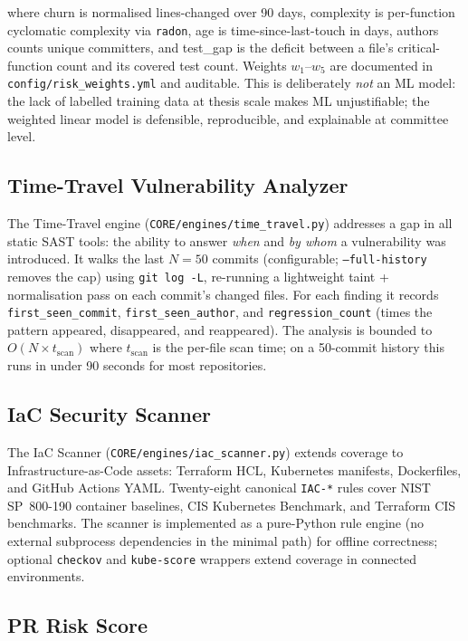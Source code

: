 where churn is normalised lines-changed over 90 days, complexity is per-function cyclomatic complexity via \texttt{radon}, age is time-since-last-touch in days, authors counts unique committers, and test\_gap is the deficit between a file's critical-function count and its covered test count. Weights $w_1$--$w_5$ are documented in \texttt{config/risk\_weights.yml} and auditable. This is deliberately \textit{not} an ML model: the lack of labelled training data at thesis scale makes ML unjustifiable; the weighted linear model is defensible, reproducible, and explainable at committee level.

\subsection{Time-Travel Vulnerability Analyzer}
\label{sec:time_travel_design}

The Time-Travel engine (\texttt{CORE/engines/time\_travel.py}) addresses a gap in all static SAST tools: the ability to answer \textit{when} and \textit{by whom} a vulnerability was introduced. It walks the last $N = 50$ commits (configurable; \texttt{--full-history} removes the cap) using \texttt{git log -L}, re-running a lightweight taint + normalisation pass on each commit's changed files. For each finding it records \texttt{first\_seen\_commit}, \texttt{first\_seen\_author}, and \texttt{regression\_count} (times the pattern appeared, disappeared, and reappeared). The analysis is bounded to $O(N \times t_{\text{scan}})$ where $t_{\text{scan}}$ is the per-file scan time; on a 50-commit history this runs in under 90 seconds for most repositories.

\subsection{IaC Security Scanner}
\label{sec:iac_design}

The IaC Scanner (\texttt{CORE/engines/iac\_scanner.py}) extends coverage to Infrastructure-as-Code assets: Terraform HCL, Kubernetes manifests, Dockerfiles, and GitHub Actions YAML. Twenty-eight canonical \texttt{IAC-*} rules cover NIST SP~800-190 container baselines, CIS Kubernetes Benchmark, and Terraform CIS benchmarks. The scanner is implemented as a pure-Python rule engine (no external subprocess dependencies in the minimal path) for offline correctness; optional \texttt{checkov} and \texttt{kube-score} wrappers extend coverage in connected environments.

\subsection{PR Risk Score}
\label{sec:pr_risk_design}

